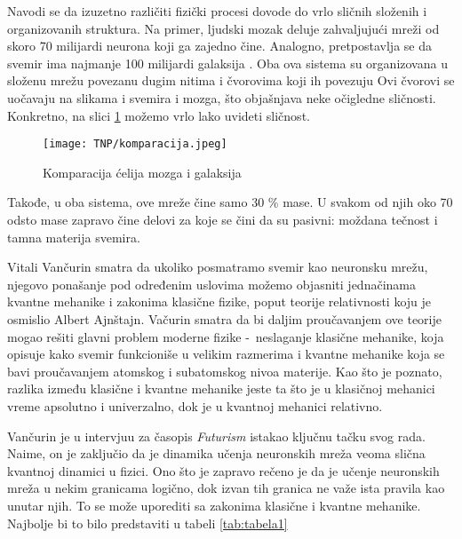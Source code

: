 \documentclass[a4paper]{article}
\begin{document}
Navodi se da izuzetno različiti fizički procesi dovode do vrlo sličnih složenih i organizovanih struktura. Na primer, ljudski mozak deluje zahvaljujući mreži od skoro 70 milijardi neurona koji ga zajedno čine. Analogno, pretpostavlja se da svemir ima najmanje 100 milijardi galaksija \cite{6}. Oba ova sistema su organizovana u složenu mrežu povezanu dugim nitima i čvorovima koji ih povezuju Ovi čvorovi se uočavaju na slikama i svemira i mozga, što objašnjava neke očigledne sličnosti. Konkretno, na slici \ref{fig:komparacija} možemo vrlo lako uvideti sličnost.

\begin{figure}[h!]
\begin{center}
\texttt{[image: TNP/komparacija.jpeg]}
\end{center}
\caption{Komparacija ćelija mozga i galaksija}
\label{fig:komparacija}
\end{figure}

\justifying
Takođe, u oba sistema, ove mreže čine samo 30 \% mase. U svakom od njih oko 70 odsto mase zapravo čine delovi za koje se čini da su pasivni: moždana tečnost i tamna materija svemira.

Vitali Vančurin smatra da ukoliko posmatramo svemir kao neuronsku mrežu, njegovo ponašanje pod određenim uslovima možemo objasniti jednačinama kvantne mehanike i zakonima klasične fizike, poput teorije relativnosti koju je osmislio Albert Ajnštajn. Vačurin smatra da bi daljim proučavanjem ove teorije mogao rešiti glavni problem moderne fizike \--\ neslaganje klasične mehanike,
koja opisuje kako svemir funkcioniše u velikim razmerima i kvantne mehanike koja se bavi proučavanjem atomskog i subatomskog nivoa materije.  Kao što je poznato, razlika između klasične i kvantne mehanike jeste ta što je u klasičnoj mehanici vreme apsolutno i univerzalno, dok je u kvantnoj mehanici relativno.

 Vančurin je u intervjuu za časopis \textit{Futurism} \cite{7} istakao ključnu tačku svog rada. Naime, on je zaključio da je dinamika učenja neuronskih mreža veoma slična kvantnoj dinamici u fizici. Ono što je zapravo rečeno je da je učenje neuronskih mreža u nekim granicama logično, dok izvan tih granica ne važe ista pravila kao unutar njih. To se može uporediti sa zakonima klasične i kvantne mehanike. Najbolje bi to bilo predstaviti u tabeli \ref{tab:tabela1}
\end{document}
